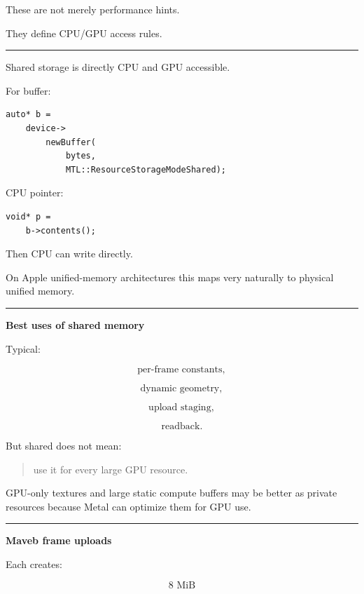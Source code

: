 These are not merely performance hints.

They define CPU/GPU access rules.

\begin{center}\rule{0.5\linewidth}{0.5pt}\end{center}

\textbf{}

Shared storage is directly CPU and GPU accessible.

For buffer:

\begin{verbatim}
auto* b =
    device->
        newBuffer(
            bytes,
            MTL::ResourceStorageModeShared);
\end{verbatim}

CPU pointer:

\begin{verbatim}
void* p =
    b->contents();
\end{verbatim}

Then CPU can write directly.

On Apple unified-memory architectures this maps very naturally to physical unified memory.

\begin{center}\rule{0.5\linewidth}{0.5pt}\end{center}

\textbf{Best uses of shared memory}

Typical:

\[
\text{per-frame constants},
\]

\[
\text{dynamic geometry},
\]

\[
\text{upload staging},
\]

\[
\text{readback}.
\]

But shared does not mean:

\begin{quote}
use it for every large GPU resource.
\end{quote}

GPU-only textures and large static compute buffers may be better as private resources because Metal can optimize them for GPU use.

\begin{center}\rule{0.5\linewidth}{0.5pt}\end{center}

\textbf{Maveb frame uploads}

Each  creates:

\[
8\text{ MiB}
\]

